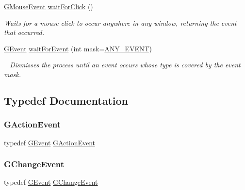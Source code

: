 \begin{DoxyCompactItemize}
$$\mbox{\hyperlink{namespacesgl_a0bc653774bff0fd137896d1cafcf8fb9}{G\+Mouse\+Event}} \mbox{\hyperlink{namespacesgl_ae6780e0be2caaa8a595026b472e74808}{wait\+For\+Click}} ()
\begin{DoxyCompactList}\small\item\em Waits for a mouse click to occur anywhere in any window, returning the event that occurred. \end{DoxyCompactList}\item 
\mbox{\hyperlink{classsgl_1_1GEvent}{G\+Event}} \mbox{\hyperlink{namespacesgl_ac49283a36a844e5c07ce0b199f481c9f}{wait\+For\+Event}} (int mask=\mbox{\hyperlink{namespacesgl_a6ff6e8ee75a08092e30167b2b7c5d6f7adb39e2dc0584d3e28dad8abaa4b926b7}{A\+N\+Y\+\_\+\+E\+V\+E\+NT}})
\begin{DoxyCompactList}\small\item\em ~\newline
 Dismisses the process until an event occurs whose type is covered by the event mask. \end{DoxyCompactList}\end{DoxyCompactItemize}


\subsection{Typedef Documentation}
\mbox{\label{namespacesgl_abbab10d11acd87e0046234a348fde918}} 
\subsubsection{\texorpdfstring{G\+Action\+Event}{GActionEvent}}
{\footnotesize\ttfamily typedef \mbox{\hyperlink{classsgl_1_1GEvent}{G\+Event}} \mbox{\hyperlink{namespacesgl_abbab10d11acd87e0046234a348fde918}{G\+Action\+Event}}}

\mbox{\label{namespacesgl_a382e59effeebd97a6937d03aac1a9473}} 
\subsubsection{\texorpdfstring{G\+Change\+Event}{GChangeEvent}}
{\footnotesize\ttfamily typedef \mbox{\hyperlink{classsgl_1_1GEvent}{G\+Event}} \mbox{\hyperlink{namespacesgl_a382e59effeebd97a6937d03aac1a9473}{G\+Change\+Event}}}

